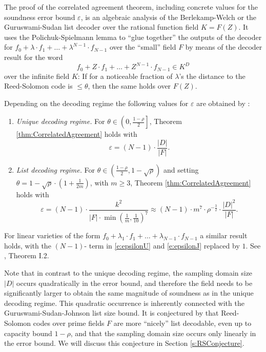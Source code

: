 \documentclass[11pt]{article}
\theoremstyle{definition}
\theoremstyle{remark}
\begin{document}
The proof of the correlated agreement theorem, including concrete values for the soundness error bound $\varepsilon$, is an algebraic analysis of the Berlekamp-Welch or the Guruswami-Sudan list decoder over the rational function field $K=F(Z)$. 
It uses the Polichuk-Spielmann lemma to ``glue together'' the outputs of the decoder for $f_0 + \lambda\cdot f_1 + \ldots +\lambda^{N-1}\cdot f_{N-1}$ over the ``small'' field $F$ by means of the decoder result for the word 
\[
f_0 + Z\cdot f_1 + \ldots + Z^{N-1}\cdot f_{N-1} \in K^D
\]
over the infinite field $K$: 
If for a noticeable fraction of  $\lambda$’s the distance to the Reed-Solomon code is $\leq\theta$, then the same holds over $F(Z)$.

Depending on the decoding regime the following values for $\varepsilon$ are obtained by \cite{ProximityGaps}:
\begin{enumerate}
\item
\textit{Unique decoding regime.} 
For $\theta\in \left(0,\frac{1-\rho}{2}\right]$, Theorem \ref{thm:CorrelatedAgreement} holds with
\begin{equation}
\label{e:epsilonU}
\varepsilon = (N-1)\cdot \frac{|D|}{|F|}.
\end{equation}
\item
\textit{List decoding regime.} 
For $\theta\in \left(\frac{1-\rho}{2},1-\sqrt\rho\right)$ and setting $\theta =1-\sqrt\rho \cdot\left(1 +\frac{1}{2m}\right)$, with $m\geq 3$, Theorem \ref{thm:CorrelatedAgreement} holds with
\begin{equation}
\label{e:epsilonJ}
\varepsilon =  (N-1)\cdot \frac{k^2}{|F|\cdot \min\left(\frac{1}{m}, \frac{1}{10}\right)^7}
\approx (N-1)\cdot m^7\cdot \rho^{-\frac{3}{2}} \cdot \frac{|D|^2}{|F|}.
\end{equation}
\end{enumerate}

For linear varieties of the form $f_0 + \lambda_1\cdot f_1+  \ldots + \lambda_{N-1}\cdot f_{N-1}$ a similar result holds, with the $(N-1)$- term in \eqref{e:epsilonU} and \eqref{e:epsilonJ} replaced by $1$. 
See \cite{ProximityGaps}, Theorem I.2. %

Note that in contrast to the unique decoding regime, the sampling domain size $|D|$ occurs quadratically in the error bound, and therefore the field needs to be significantly larger to obtain the same magnitude of soundness as in the unique decoding regime.  
This quadratic occurrence is inherently connected with the Guruswami-Sudan-Johnson list size bound. 
It is conjectured by \cite{DEEPFRI} that Reed-Solomon codes over prime fields $F$ are more ``nicely'' list decodable, even up to capacity bound $1-\rho$, and that the sampling domain size occurs only linearly in the error bound. 
We will discuss this conjecture in Section \ref{s:RSConjecture}. 
\end{document}
